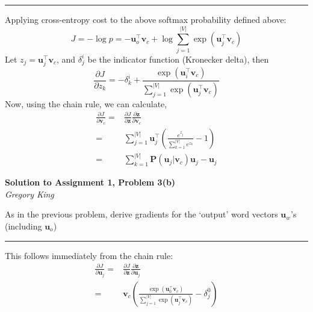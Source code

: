 \documentclass[letter,12pt]{article}
\newcommand{\myhwtitle}[3]
{\begin{center}
{\large {\bf Solution to Assignment {#1}, Problem {#2}}}\\
\medskip 
{\it {#3}} %
\end{center}}
\begin{document}
\noindent\rule{\textwidth}{0.4pt}\vspace{5mm}
Applying cross-entropy cost to the above softmax probability defined above:
\begin{equation}
J =-\log{p} = - {\boldsymbol u}_{o}^{\top}{\boldsymbol v}_{c} + \log\sum^{\vert{V}\vert}_{j=1}\exp{({\boldsymbol u}_{j}^{\top}{\boldsymbol v}_{c})}
\end{equation}
Let $z_{j}={\boldsymbol u}_{j}^{\top}{\boldsymbol v}_{c}$, and $\delta^{i}_{j}$ be the indicator function (Kronecker delta), then
\begin{equation}
\frac{\partial J}{\partial{z_{k}}} = - \delta^{i}_{k} + \frac{\exp{({\boldsymbol u}_{i}^{\top}{\boldsymbol v}_{c})}}{\sum^{\vert{V}\vert}_{j=1}\exp{({\boldsymbol u}_{j}^{\top}{\boldsymbol v}_{c})}}
\end{equation}
Now, using the chain rule, we can calculate,
\begin{align}
\frac{\partial J}{\partial{{\boldsymbol v}_{c}}} =& \frac{\partial J}{\partial{{\boldsymbol z}}}\frac{\partial{{\boldsymbol z}}}{\partial{{\boldsymbol v}_{c}}} \\
                                                                    =& \sum^{\vert{V}\vert}_{j=1}{\boldsymbol u}_{j}^{\top}\left(\frac{e^{z_{j}}}{\sum^{\vert{V}\vert}_{k=1}e^{z_{k}}} -  1\right) \\
                                                                    =& \sum^{\vert{V}\vert}_{k=1}{\boldsymbol P}({\boldsymbol u}_{j} \vert {\boldsymbol v}_{c} ){\boldsymbol u}_{j} - {\boldsymbol u}_{j}
\end{align}

\clearpage

\myhwtitle{1}{3(b)}{Gregory King}

\bigskip
\noindent As in the previous problem, derive gradients for the `output' word vectors ${\boldsymbol u}_{w}$'s (including ${\boldsymbol u}_{o}$)\vspace{5mm}
\noindent\rule{\textwidth}{0.4pt}\vspace{5mm}
This follows immediately from the chain rule:
\begin{align}
\frac{\partial J}{\partial{\boldsymbol u}_{j}} = &\frac{\partial J}{\partial{{\boldsymbol z}}}\frac{\partial{{\boldsymbol z}}}{\partial{\boldsymbol u}_{j}} \\
                                                                  = &{\boldsymbol v}_{c}\left(\frac{\exp{({\boldsymbol u}^{\top}_{0}{\boldsymbol v}_{c})}}{\sum^{\vert{V}\vert}_{j=1}\exp{({\boldsymbol u}^{\top}_{j}{\boldsymbol v}_{c})}} - \delta^{0}_{j}\right)
\end{align}
\clearpage
\end{document}
